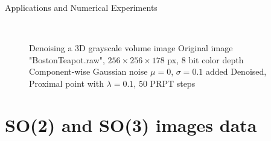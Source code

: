 \begin{chapter}{Applications and Numerical Experiments}
\begin{figure}[h!]
    \centering
    \\
    \caption[Denoising 3D Grayscale Volume Data]{Denoising a 3D grayscale volume image
	 Original image "BostonTeapot.raw", $256\times 256 \times 178$ px, 8 bit color depth
	 Component-wise Gaussian noise $\mu=0$, $\sigma=0.1$ added
	 Denoised, Proximal point with $\lambda=0.1$, $50$ PRPT steps
	\label{fig:application_volume1}
    }
\end{figure}


\FloatBarrier
\section{SO(2) and SO(3) images data} %
\label{sec:SO images data}


\end{chapter}
